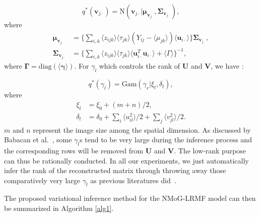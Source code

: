 \documentclass[journal]{IEEEtran}
\begin{document}
\begin{equation}\label{v}
q^*(\bm{v}_{j \cdot})= \mathrm{N}(\bm{v}_{j \cdot}|\bm{\mu}_{\bm{v}_{j \cdot}},\bm{\Sigma}_{\bm{v}_{j \cdot}}),
\end{equation}
where
\begin{equation} \label{vste}
\begin{split}
\bm{\mu}_{\bm{v}_{j \cdot }} &= \{ \sum\nolimits_{i,k}{ \langle z_{ijk} \rangle \langle \tau_{jk} \rangle   (Y_{ij}- \langle \mu_{jk} \rangle )  \langle \bm{u}_{i \cdot } \rangle } \}\bm{\Sigma}_{\bm{v}_{j \cdot}},\\
\bm{\Sigma}_{\bm{v}_{j \cdot}} &=  \{ \sum\nolimits_{i,k}{ \langle z_{ijk} \rangle   \langle \tau_{jk} \rangle   \langle \bm{u}_{i\cdot }^T \bm{u}_{i\cdot } \rangle  +  \langle \Gamma \rangle }  \}^{-1},
\end{split}
\end{equation}
where $ \bm{\Gamma} = \mathrm{diag}(\langle \bm{\gamma} \rangle)$. For $ \gamma_l $ which controls the rank of $ \bm{U} $ and $ \bm{V} $, we have :

\begin{equation} \label{gam}
q^*(\gamma_l) = \mathrm{Gam}(\gamma_r|\xi_l,\delta_l),
\end{equation}
where
\begin{equation*} \label{gam1}
\begin{split}
\xi_l &= \xi_0 + (m+n)/2,\\
\delta_l & = \delta_0 + \sum\nolimits_{i}{\langle u_{il}^2 \rangle}/2 +\sum\nolimits_{j}{\langle v_{jl}^2 \rangle}/2.
\end{split}
\end{equation*}
$ m $ and $ n $ represent the image size among the spatial dimension. As discussed by Babacan et al.~\cite{babacan2012sparse}, some $\gamma_l$s tend to
be very large during the inference process and the corresponding  rows will be removed from $ \bm{U} $ and $ \bm{V} $. The low-rank purpose can thus be rationally conducted. In all our experiments, we just automatically infer the rank of the reconstructed matrix through throwing away those comparatively very large $ \gamma_l $ as previous literatures did~\cite{zhao2014robust}.

The proposed variational inference method for the NMoG-LRMF model can then be summarized in Algorithm \ref{alg1}.
\end{document}
